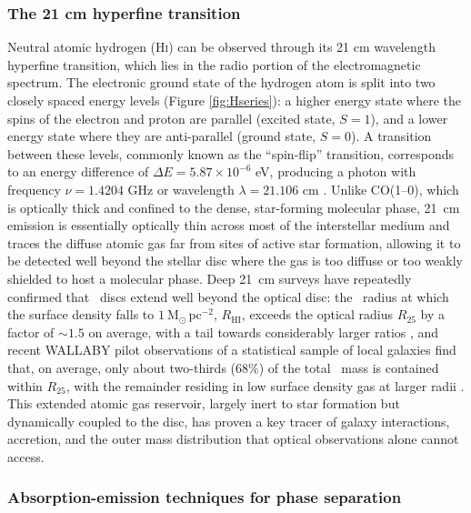 \subsubsection{The 21 cm hyperfine transition}

Neutral atomic hydrogen (\textrm{H\textsc{i}}) can be observed through its 21 cm wavelength hyperfine transition, which lies in the radio portion of the electromagnetic spectrum. The electronic ground state of the hydrogen atom is split into two closely spaced energy levels (Figure \ref{fig:Hseries}): a higher energy state where the spins of the electron and proton are parallel (excited state, $S=1$), and a lower energy state where they are anti-parallel (ground state, $S=0$). A transition between these levels, commonly known as the ``spin-flip'' transition, corresponds to an energy difference of $\Delta E = 5.87 \times 10^{-6}$ eV, producing a photon with frequency $\nu = 1.4204$ GHz or wavelength $\lambda = 21.106$ cm \citep{ISF2011}.
Unlike CO(1--0), which is optically thick and confined to the dense,
star-forming molecular phase, 21~cm emission is essentially optically thin across
most of the interstellar medium and traces the diffuse atomic gas far from sites of
active star formation, allowing it to be detected well beyond the stellar disc where
the gas is too diffuse or too weakly shielded to host a molecular phase. Deep 21~cm
surveys have repeatedly confirmed that \HI\ discs extend well beyond the optical
disc: the \HI\ radius at which the surface density falls to
$1\ \mathrm{M_\odot\,pc^{-2}}$, $R_{\mathrm{HI}}$, exceeds the optical radius
$R_{25}$ by a factor of $\sim 1.5$ on average, with a tail towards considerably
larger ratios \citep{Broeils1997, Wang2016}, and recent WALLABY pilot observations of
a statistical sample of local galaxies find that, on average, only about two-thirds
($68\%$) of the total \HI\ mass is contained within $R_{25}$, with the remainder
residing in low surface density gas at larger radii \citep{Lee2025}. This extended
atomic gas reservoir, largely inert to star formation but dynamically coupled to the
disc, has proven a key tracer of galaxy interactions, accretion, and the outer mass
distribution that optical observations alone cannot access.

\subsubsection{Absorption-emission techniques for phase separation}


